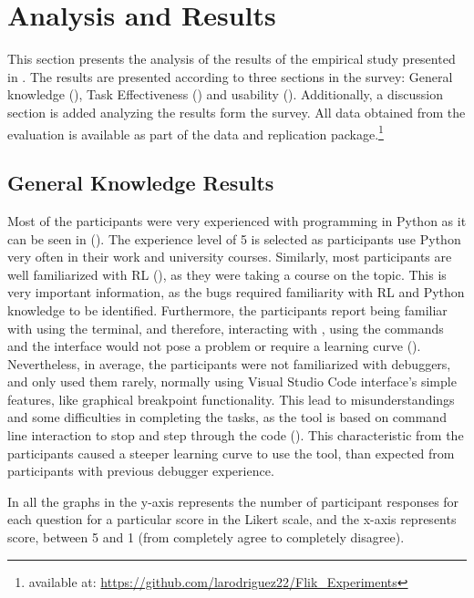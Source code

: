 
\section{Analysis and Results}
\label{sec:results}

This section presents the analysis of the results of the empirical study presented in 
. The results are presented according to three sections in the survey: General 
knowledge (), Task Effectiveness () and usability 
(). Additionally, a discussion section is added analyzing the results form the survey. 
All data obtained from the evaluation is available as part of the data and replication 
package.\footnote{available at: \url{https://github.com/larodriguez22/Flik_Experiments}} 


\subsection{General Knowledge Results}
\label{sec:general-knowledge}

Most of the participants were very experienced with programming in Python as it can be seen in 
(). The experience level of 5 is selected as participants use Python very 
often in their work and university courses. 
Similarly, most participants are well familiarized with \ac{RL} (), as they were 
taking a course on the topic. This is very important information, as the bugs required familiarity with 
\ac{RL} and Python knowledge to be identified. Furthermore, the participants report being familiar 
with using the terminal, and therefore, interacting with \flik, using the commands and the interface 
would not pose a problem or require a learning curve (). 
Nevertheless, in average, the participants were not familiarized with debuggers, and only used them  
rarely, normally using Visual Studio Code interface's simple features, like graphical breakpoint 
functionality. This lead to misunderstandings and some difficulties in completing the tasks, as the 
tool is based on command line interaction to stop and step through the code 
(). This characteristic from the participants caused a steeper learning 
curve to use the tool, than expected from participants with previous debugger experience.

In all the graphs in  the y-axis represents the number of participant  
responses for each question for a particular score in the Likert scale, and the x-axis represents score, 
between 5 and 1 (from completely agree to completely disagree).

